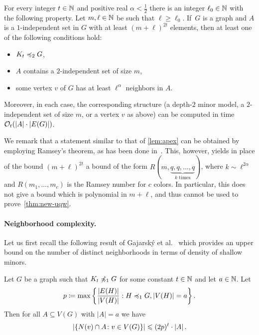 \begin{lemma}\label{lem:apex}
For every integer $t\in \mathbb{N}$ and positive real $\alpha<\frac 1 2$ 
there is an integer $\ell_0\in\mathbb{N}$ with the following property.
Let $m,\ell\in \mathbb{N}$ be such that $\ell\ge \ell_0$. 
If~$G$ is a graph and $A$ is a $1$-independent set in $G$
with at least $(m+\ell)^{2t}$ elements,
then at least one of the following conditions hold:
\begin{itemize}
  \item $K_t\preccurlyeq_{2} G$,
\item  $A$ contains a $2$-independent set of size $m$, 
\item  some vertex $v$ of $G$
has at least $\ell^{\alpha}$ neighbors in $A$.
\end{itemize}
Moreover, in each case, the corresponding structure (a depth-$2$ minor model, a $2$-independent set of size $m$, or a vertex $v$ as above) can be computed in time $\mathcal{O}_t(|A|\cdot |E(G)|)$.
\end{lemma}

We remark that a statement similar to that of \cref{lem:apex}
can be obtained by employing Ramsey's theorem, as has been done in~\cite{nevsetvril2011nowhere}. This, however, yields
in place of the bound $(m+\ell)^{2t}$ a bound of the form $R(m,\underbrace{q,q,\ldots,q}_{k\text{ times}})$,
where $k\sim\ell^{2\alpha}$ and $R(m_1,\ldots,m_c)$
is the Ramsey number for $c$ colors.
In particular, this does not give a bound which is polynomial in $m+\ell$, and thus cannot be used to prove~\cref{thm:new-uqw}.

\paragraph*{Neighborhood complexity.} Let us first recall the following result of Gajarsk\'y et al.~\cite{gajarsky2017kernelization}
which provides an upper bound on the number of distinct neighborhoods in terms of density of shallow minors. 

\begin{lemma}\label{lem:pre-diversity}
Let $G$ be a graph such that $K_t\not\preccurlyeq_{1} G$ for some constant $t\in \mathbb{N}$ and let $a\in \mathbb{N}$. 
Let \[p\coloneqq \max
\left\{\frac{|E(H)|}{|V(H)|} : H\preccurlyeq_1 G, |V(H)|= a\right\}.\] 
Then for all $A\subseteq V(G)$ with $|A|= a$ we have 
\[\left\lvert\{N(v)\cap A \colon v\in V(G)\}\right\rvert\leqslant(2p)^t\cdot \left\lvert A\right\rvert.\]
\end{lemma}

